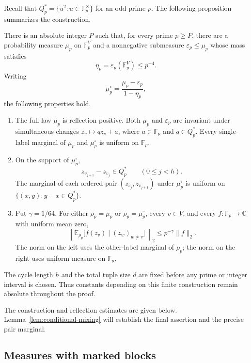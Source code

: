 Recall that \(Q_p^*=\{u^2:u\in\mathbb F_p^\times\}\) for an odd
prime \(p\).  The following proposition summarizes the construction.

\begin{proposition}
\label{prop:tuple-laws}
There is an absolute integer \(P\) such that, for every prime
\(p\ge P\), there are a probability measure \(\mu_p\) on
\(\mathbb F_p^V\) and a nonnegative submeasure \(\varepsilon_p\le\mu_p\)
whose mass satisfies
\[
 \eta_p=\varepsilon_p(\mathbb F_p^V)\le p^{-4}.
\]
Writing
\[
 \mu_p^\circ=\frac{\mu_p-\varepsilon_p}{1-\eta_p},
\]
the following properties hold.
\begin{enumerate}
\item The full law \(\mu_p\) is reflection positive.  Both
\(\mu_p\) and \(\varepsilon_p\) are invariant under simultaneous
changes \(z_v\mapsto qz_v+a\), where \(a\in\mathbb F_p\) and
\(q\in Q_p^*\).  Every single-label marginal of \(\mu_p\) and
\(\mu_p^\circ\) is uniform on \(\mathbb F_p\).
\item On the support of
\(\mu_p^\circ\),
\[
 z_{v_{j+1}}-z_{v_j}\in Q_p^*\qquad(0\le j<h).
\]
The marginal of each ordered pair \((z_{v_j},z_{v_{j+1}})\) under
\(\mu_p^\circ\) is uniform on
\(\{(x,y):y-x\in Q_p^*\}\).
\item Put \(\gamma=1/64\).  For either \(\rho_p=\mu_p\) or
\(\rho_p=\mu_p^\circ\), every \(v\in V\), and every
\(f:\mathbb F_p\to\mathbb C\) with uniform mean zero,
\begin{equation}
 \left\|\mathbb E_{\rho_p}
 \bigl[f(z_v)\mid(z_w)_{w\ne v}\bigr]\right\|_2
 \le p^{-\gamma}\|f\|_2.
 \label{eq:tuple-conditional-bound}
\end{equation}
The norm on the left uses the other-label marginal of \(\rho_p\);
the norm on the right uses uniform measure on \(\mathbb F_p\).
\end{enumerate}
\end{proposition}

The cycle length $h$ and the total tuple size $d$ are fixed before any
prime or integer interval is chosen. Thus constants depending on this
finite construction remain absolute throughout the proof.

The construction and reflection estimates are given below.
Lemma~\ref{lem:conditional-mixing} will establish the final assertion
and the precise pair marginal.

\subsection{Measures with marked blocks}

